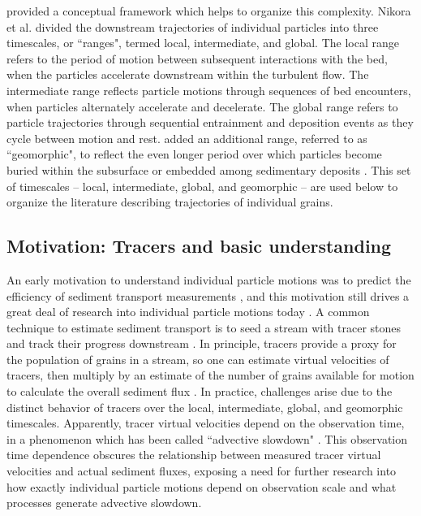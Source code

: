 \citet{Nikora2001,Nikora2002} provided a conceptual framework which helps to organize this complexity.
Nikora et al. divided the downstream trajectories of individual particles into three timescales, or ``ranges", termed local, intermediate, and global.
The local range refers to the period of motion between subsequent interactions with the bed, when the particles accelerate downstream within the turbulent flow.
The intermediate range reflects particle motions through sequences of bed encounters, when particles alternately accelerate and decelerate. 
The global range refers to particle trajectories through sequential entrainment and deposition events as they cycle between motion and rest.
\citet{Hassan2017} added an additional range, referred to as ``geomorphic", to reflect the even longer period over which particles become buried within the subsurface or embedded among sedimentary deposits \citep{Bradley2017}.
This set of timescales -- local, intermediate, global, and geomorphic -- are used below to organize the literature describing trajectories of individual grains.

\subsection{Motivation: Tracers and basic understanding}

An early motivation to understand individual particle motions was to predict the efficiency of sediment transport measurements \citep{Ettema2004}, and this motivation still drives a great deal of research into individual particle motions today \citep{Hassan2017,Pretzlav2021}.
A common technique to estimate sediment transport is to seed a stream with tracer stones and track their progress downstream \citep{Einstein1937, Takayama1965, Pretzlav2021}.
In principle, tracers provide a proxy for the population of grains in a stream, so one can estimate virtual velocities of tracers, then multiply by an estimate of the number of grains available for motion to calculate the overall sediment flux \citep{Wilcock1997a,Ferguson2002}.
In practice, challenges arise due to the distinct behavior of tracers over the local, intermediate, global, and geomorphic timescales. Apparently, tracer virtual velocities depend on the observation time, in a phenomenon which has been called ``advective slowdown" \citep{Ferguson2002,Haschenburger2011, Haschenburger2013, Pelosi2016}. This observation time dependence obscures the relationship between measured tracer virtual velocities and actual sediment fluxes, exposing a need for further research into how exactly individual particle motions depend on observation scale and what processes generate advective slowdown.

